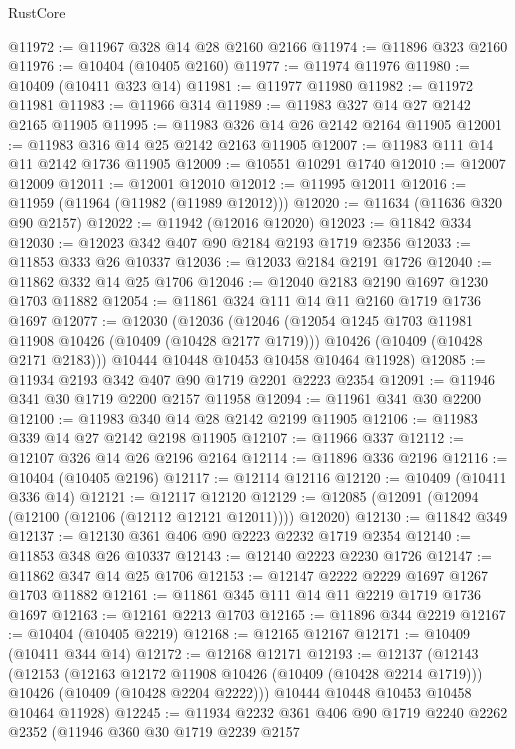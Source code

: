 \begin{lexlean}{RustCore}
\begin{coremodule}
@11972 := @11967 @328 @14 @28 @2160 @2166
@11974 := @11896 @323 @2160
@11976 := @10404 (@10405 @2160)
@11977 := @11974 @11976
@11980 := @10409 (@10411 @323 @14)
@11981 := @11977 @11980
@11982 := @11972 @11981
@11983 := @11966 @314
@11989 := @11983 @327 @14 @27 @2142 @2165 @11905
@11995 := @11983 @326 @14 @26 @2142 @2164 @11905
@12001 := @11983 @316 @14 @25 @2142 @2163 @11905
@12007 := @11983 @111 @14 @11 @2142 @1736 @11905
@12009 := @10551 @10291 @1740
@12010 := @12007 @12009
@12011 := @12001 @12010
@12012 := @11995 @12011
@12016 := @11959 (@11964 (@11982 (@11989 @12012)))
@12020 := @11634 (@11636 @320 @90 @2157)
@12022 := @11942 (@12016 @12020)
@12023 := @11842 @334
@12030 := @12023 @342 @407 @90 @2184 @2193 @1719 @2356
@12033 := @11853 @333 @26 @10337
@12036 := @12033 @2184 @2191 @1726
@12040 := @11862 @332 @14 @25 @1706
@12046 := @12040 @2183 @2190 @1697 @1230 @1703 @11882
@12054 := @11861 @324 @111 @14 @11 @2160 @1719 @1736 @1697
@12077 := @12030
    (@12036
      (@12046
        (@12054 @1245 @1703 @11981 @11908 @10426 (@10409 (@10428 @2177 @1719)))
        @10426
        (@10409 (@10428 @2171 @2183)))
      @10444
      @10448
      @10453
      @10458
      @10464
      @11928)
@12085 := @11934 @2193 @342 @407 @90 @1719 @2201 @2223 @2354
@12091 := @11946 @341 @30 @1719 @2200 @2157 @11958
@12094 := @11961 @341 @30 @2200
@12100 := @11983 @340 @14 @28 @2142 @2199 @11905
@12106 := @11983 @339 @14 @27 @2142 @2198 @11905
@12107 := @11966 @337
@12112 := @12107 @326 @14 @26 @2196 @2164
@12114 := @11896 @336 @2196
@12116 := @10404 (@10405 @2196)
@12117 := @12114 @12116
@12120 := @10409 (@10411 @336 @14)
@12121 := @12117 @12120
@12129 := @12085 (@12091 (@12094 (@12100 (@12106 (@12112 @12121 @12011)))) @12020)
@12130 := @11842 @349
@12137 := @12130 @361 @406 @90 @2223 @2232 @1719 @2354
@12140 := @11853 @348 @26 @10337
@12143 := @12140 @2223 @2230 @1726
@12147 := @11862 @347 @14 @25 @1706
@12153 := @12147 @2222 @2229 @1697 @1267 @1703 @11882
@12161 := @11861 @345 @111 @14 @11 @2219 @1719 @1736 @1697
@12163 := @12161 @2213 @1703
@12165 := @11896 @344 @2219
@12167 := @10404 (@10405 @2219)
@12168 := @12165 @12167
@12171 := @10409 (@10411 @344 @14)
@12172 := @12168 @12171
@12193 := @12137
    (@12143
      (@12153
        (@12163 @12172 @11908 @10426 (@10409 (@10428 @2214 @1719)))
        @10426
        (@10409 (@10428 @2204 @2222)))
      @10444
      @10448
      @10453
      @10458
      @10464
      @11928)
@12245 := @11934
    @2232
    @361
    @406
    @90
    @1719
    @2240
    @2262
    @2352
    (@11946
      @360
      @30
      @1719
      @2239
      @2157

\end{coremodule}
\end{lexlean}
